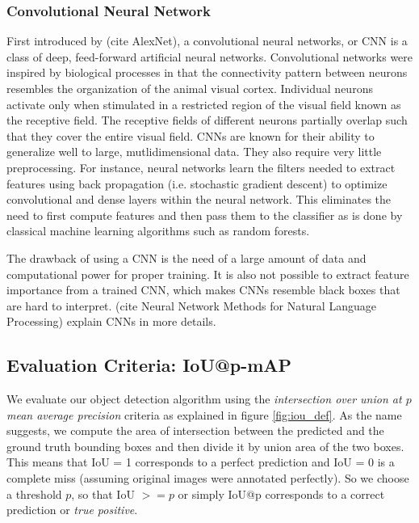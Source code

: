 		\subsubsection{Convolutional Neural Network}
			First introduced by (cite AlexNet), a convolutional neural networks, or CNN is a class of deep, feed-forward artificial neural networks. Convolutional networks were inspired by biological processes in that the connectivity pattern between neurons resembles the organization of the animal visual cortex. Individual neurons activate only when stimulated in a restricted region of the visual field known as the receptive field. The receptive fields of different neurons partially overlap such that they cover the entire visual field. CNNs are known for their ability to generalize well to large, mutlidimensional data. They also require very little preprocessing. For instance, neural networks learn the filters needed to extract features using back propagation (i.e. stochastic gradient descent) to optimize convolutional and dense layers within the neural network. This eliminates the need to first compute features and then pass them to the classifier as is done by classical machine learning algorithms such as random forests.
			
			The drawback of using a CNN is the need of a large amount of data and computational power for proper training. It is also not possible to extract feature importance from a trained CNN, which makes CNNs resemble black boxes that are hard to interpret.  
			 (cite Neural Network Methods for Natural Language Processing) explain CNNs in more details.
		
		\subsection{Evaluation Criteria: IoU@p-mAP}
		  We evaluate our object detection algorithm using the \textit{intersection over union at $p$ mean average precision} criteria as explained in figure \ref{fig:iou_def}. As the  name suggests, we compute the area of intersection between the predicted and the ground truth bounding boxes and then divide it by union area of the two boxes. This means that IoU = 1 corresponds to a perfect prediction and IoU = 0 is a complete miss (assuming original images were annotated perfectly). So we choose a threshold $p$, so that IoU $>= p$ or simply IoU@p corresponds to a correct prediction or \textit{true positive}. 		  

